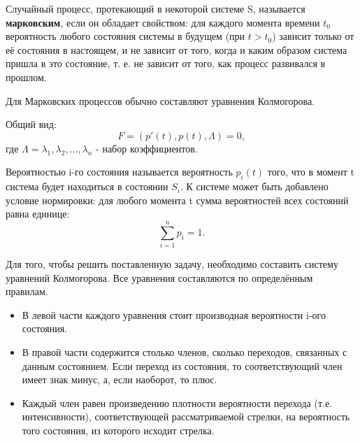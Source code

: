 Случайный процесс, протекающий в некоторой системе S, называется \textbf{марковским}, если он обладает свойством: для каждого момента времени $t_0$ вероятность любого состояния системы в будущем (при $t > t_0$) зависит только от её состояния в настоящем, и не зависит от того, когда и каким образом система пришла в это состояние, т. е. не зависит от того, как процесс развивался в прошлом. 

Для Марковских процессов обычно составляют уравнения Колмогорова. 

Общий вид:
$$
	F = (p'(t), p(t), \Lambda) = 0,
$$
где $\Lambda = \lambda_1, \lambda_2, ..., \lambda_n$ - набор коэффициентов.

Вероятностью i-го состояния называется вероятность $p_i(t)$ того, что в момент t система будет находиться в состоянии $S_i$. К системе может быть добавлено условие нормировки: для любого
момента t сумма вероятностей всех состояний равна единице:
$$
\sum_{i = 1}^n p_i = 1.
$$

Для того, чтобы решить поставленную задачу, необходимо составить систему
уравнений Колмогорова. Все уравнения составляются по определённым правилам.
\begin{itemize}
	\item В левой части каждого уравнения стоит производная вероятности i-ого состояния.
	
	\item В правой части содержится столько членов, сколько переходов, связанных с данным состоянием. Если переход из состояния, то соответствующий член имеет знак минус, а, если наоборот, то плюс. 
	
	\item Каждый член равен произведению плотности вероятности перехода (т.е. интенсивности), соответствующей рассматриваемой стрелки, на вероятность того состояния, из которого исходит стрелка.
\end{itemize}